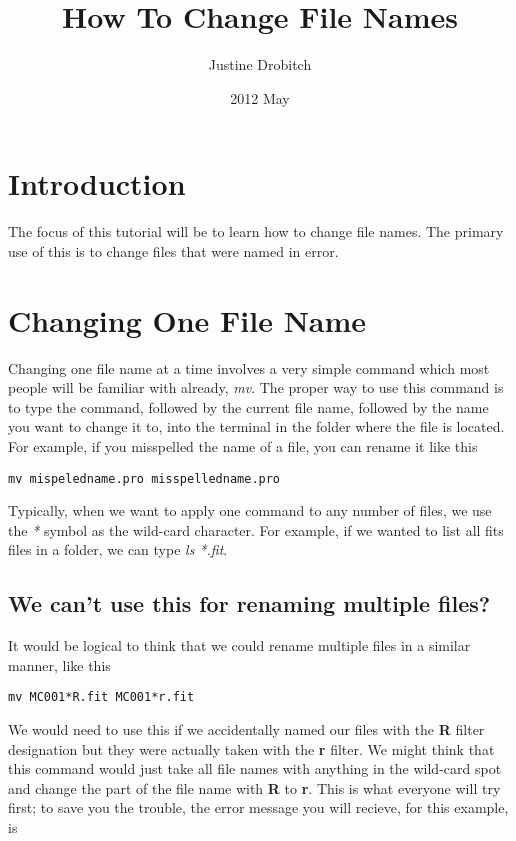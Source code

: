\documentclass[10pt,preprint]{aastex}
\begin{document}
\title{How To Change File Names}
\author{Justine Drobitch}
\date{2012 May}

\section{Introduction}
The focus of this tutorial will be to learn how to change file names.  The primary use of this is to change files that were named in error.

\section{Changing One File Name}

Changing one file name at a time involves a very simple command which most people will be familiar with already, \emph{mv}. The proper way to use this command is to type the command, followed by the current file name, followed by the name you want to change it to, into the terminal in the folder where the file is located.  For example, if you misspelled the name of a file, you can rename it like this

\begin{verbatim}
mv mispeledname.pro misspelledname.pro 
\end{verbatim}

Typically, when we want to apply one command to any number of files, we use the \emph{*} symbol as the wild-card character.  For example, if we wanted to list all fits files in a folder, we can type \emph{ls *.fit}.  

\subsection{We can't use this for renaming multiple files?}
It would be logical to think that we could rename multiple files in a similar manner, like this

\begin{verbatim}
mv MC001*R.fit MC001*r.fit
\end{verbatim}

We would need to use this if we accidentally named our files with the \textbf{R} filter designation but they were actually taken with the \textbf{r} filter.  We might think that this command would just take all file names with anything in the wild-card spot and change the part of the file name with \textbf{R} to \textbf{r}.  This is what everyone will try first; to save you the trouble, the error message you will recieve, for this example, is
\end{document}
